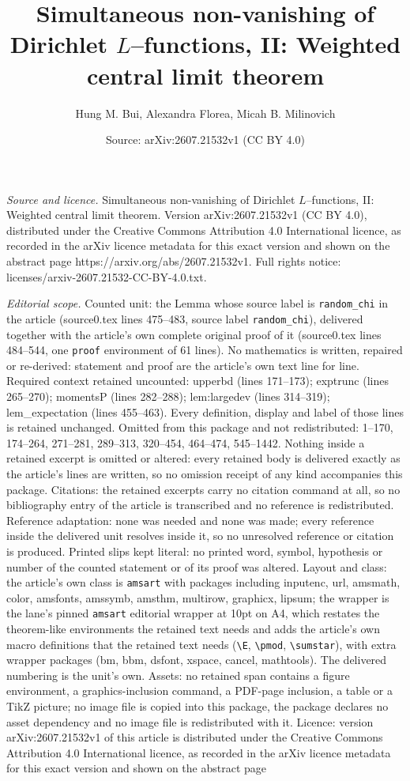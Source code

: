 \documentclass[10pt,a4paper]{amsart}
\title[Simultaneous non-vanishing of Dirichlet $L$--functions, II: ]{Simultaneous non-vanishing of Dirichlet $L$--functions, II: Weighted central limit theorem}
\author{Hung M. Bui, Alexandra Florea, Micah B. Milinovich}
\date{Source: arXiv:2607.21532v1 (CC BY 4.0)}
\begin{document}
\maketitle

\noindent\emph{Source and licence.} Simultaneous non-vanishing of Dirichlet $L$--functions, II: Weighted central limit theorem. Version arXiv:2607.21532v1 (CC BY 4.0), distributed under the Creative Commons Attribution 4.0 International licence, as recorded in the arXiv licence metadata for this exact version and shown on the abstract page https://arxiv.org/abs/2607.21532v1. Full rights notice: licenses/arxiv-2607.21532-CC-BY-4.0.txt.\par\smallskip

\noindent\textit{Editorial scope.} Counted unit: the Lemma whose source label is \texttt{random\_chi} in the article (source0.tex lines 475--483, source label \texttt{random\_chi}), delivered together with the article's own complete original proof of it (source0.tex lines 484--544, one \texttt{proof} environment of 61 lines). No mathematics is written, repaired or re-derived: statement and proof are the article's own text line for line. Required context retained uncounted: upperbd (lines 171--173); exptrunc (lines 265--270); momentsP (lines 282--288); lem:largedev (lines 314--319); lem\_expectation (lines 455--463). Every definition, display and label of those lines is retained unchanged. Omitted from this package and not redistributed: 1--170, 174--264, 271--281, 289--313, 320--454, 464--474, 545--1442. Nothing inside a retained excerpt is omitted or altered: every retained body is delivered exactly as the article's lines are written, so no omission receipt of any kind accompanies this package. Citations: the retained excerpts carry no citation command at all, so no bibliography entry of the article is transcribed and no reference is redistributed. Reference adaptation: none was needed and none was made; every reference inside the delivered unit resolves inside it, so no unresolved reference or citation is produced. Printed slips kept literal: no printed word, symbol, hypothesis or number of the counted statement or of its proof was altered. Layout and class: the article's own class is \texttt{amsart} with packages including inputenc, url, amsmath, color, amsfonts, amssymb, amsthm, multirow, graphicx, lipsum; the wrapper is the lane's pinned \texttt{amsart} editorial wrapper at 10pt on A4, which restates the theorem-like environments the retained text needs and adds the article's own macro definitions that the retained text needs (\texttt{\textbackslash E}, \texttt{\textbackslash pmod}, \texttt{\textbackslash sumstar}), with extra wrapper packages (bm, bbm, dsfont, xspace, cancel, mathtools). The delivered numbering is the unit's own. Assets: no retained span contains a figure environment, a graphics-inclusion command, a PDF-page inclusion, a table or a TikZ picture; no image file is copied into this package, the package declares no asset dependency and no image file is redistributed with it. Licence: version arXiv:2607.21532v1 of this article is distributed under the Creative Commons Attribution 4.0 International licence, as recorded in the arXiv licence metadata for this exact version and shown on the abstract page 
\end{document}
